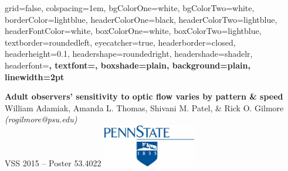 \documentclass[landscape,final,a0paper,fontscale=0.285]{baposter}
\begin{document}


\begin{poster}%
  {
  grid=false,
  colspacing=1em,
  bgColorOne=white,
  bgColorTwo=white,
  borderColor=lightblue,
  headerColorOne=black,
  headerColorTwo=lightblue,
  headerFontColor=white,
  boxColorOne=white,
  boxColorTwo=lightblue,
  textborder=roundedleft,
  eyecatcher=true,
  headerborder=closed,
  headerheight=0.1\textheight,
  headershape=roundedright,
  headershade=shadelr,
  headerfont=\Large\bf\textsc, %
  textfont={\setlength{\parindent}{1.5em}},
  boxshade=plain,
  background=plain,
  linewidth=2pt
  }

  {\bf{Adult observers' sensitivity to optic flow varies by pattern \& speed}\vspace{0.2em}}
  {William Adamiak, Amanda L. Thomas, Shivani M. Patel, \& Rick O. Gilmore \emph{(rogilmore@psu.edu)}\\ \vspace{0.2em}
  VSS 2015 -- Poster 53.4022}
  {\includegraphics[height=5em]{img/psu-logo-700-319.jpg}}



\end{poster}
\end{document}
